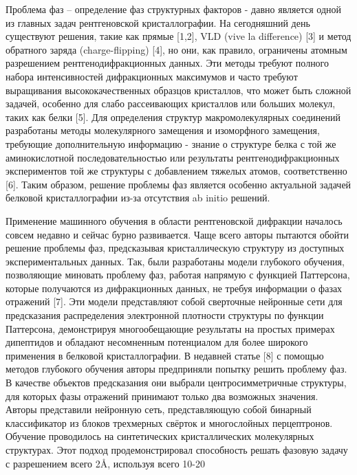 Проблема фаз – определение фаз структурных факторов - давно является одной из главных задач рентгеновской кристаллографии. На сегодняшний день существуют решения, такие как прямые [1,2], VLD (vive la difference) [3] и метод обратного заряда (charge-flipping) [4], но они, как правило, ограничены атомным разрешением рентгенодифракционных данных. Эти методы требуют полного набора интенсивностей дифракционных максимумов и часто требуют выращивания высококачественных образцов кристаллов, что может быть сложной задачей, особенно для слабо рассеивающих кристаллов или больших молекул, таких как белки [5]. Для определения структур макромолекулярных соединений разработаны методы молекулярного замещения и изоморфного замещения, требующие дополнительную информацию - знание о структуре белка с той же аминокислотной последовательностью или результаты рентгенодифракционных экспериментов той же структуры с добавлением тяжелых атомов, соответственно [6]. Таким образом, решение проблемы фаз является особенно актуальной задачей белковой кристаллографии из-за отсутствия ab initio решений. 

Применение машинного обучения в области рентгеновской дифракции началось совсем недавно и сейчас бурно развивается. Чаще всего авторы пытаются обойти решение проблемы фаз, предсказывая кристаллическую структуру из доступных экспериментальных данных. Так, были разработаны модели глубокого обучения, позволяющие миновать проблему фаз, работая напрямую с функцией Паттерсона, которые получаются из дифракционных данных, не требуя информации о фазах отражений [7]. Эти модели представляют собой сверточные нейронные сети для предсказания распределения электронной плотности структуры по функции Паттерсона, демонстрируя многообещающие результаты на простых примерах дипептидов и обладают несомненным потенциалом для более широкого применения в белковой кристаллографии.
В недавней статье [8] с помощью методов глубокого обучения авторы предприняли попытку решить проблему фаз. В качестве объектов предсказания они выбрали центросимметричные структуры, для которых фазы отражений принимают только два возможных значения. Авторы представили нейронную сеть, представляющую собой бинарный классификатор из блоков трехмерных свёрток и многослойных перцептронов. Обучение проводилось на синтетических кристаллических молекулярных структурах. Этот подход продемонстрировал способность решать фазовую задачу с разрешением всего 2Å, используя всего 10-20%

